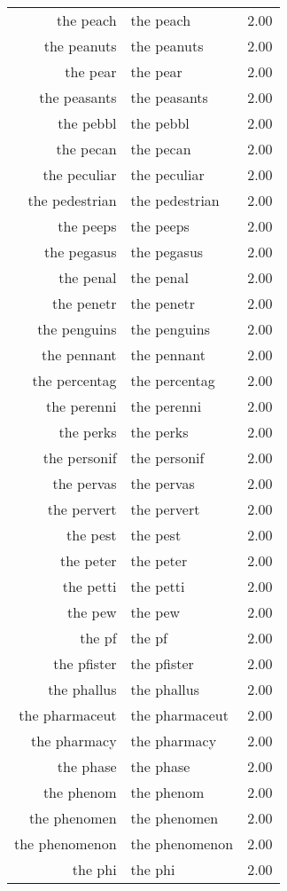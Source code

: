 \begin{table}[ht]
\begin{tabular}{rlr}
  the peach & the peach & 2.00 \\ 
  the peanuts & the peanuts & 2.00 \\ 
  the pear & the pear & 2.00 \\ 
  the peasants & the peasants & 2.00 \\ 
  the pebbl & the pebbl & 2.00 \\ 
  the pecan & the pecan & 2.00 \\ 
  the peculiar & the peculiar & 2.00 \\ 
  the pedestrian & the pedestrian & 2.00 \\ 
  the peeps & the peeps & 2.00 \\ 
  the pegasus & the pegasus & 2.00 \\ 
  the penal & the penal & 2.00 \\ 
  the penetr & the penetr & 2.00 \\ 
  the penguins & the penguins & 2.00 \\ 
  the pennant & the pennant & 2.00 \\ 
  the percentag & the percentag & 2.00 \\ 
  the perenni & the perenni & 2.00 \\ 
  the perks & the perks & 2.00 \\ 
  the personif & the personif & 2.00 \\ 
  the pervas & the pervas & 2.00 \\ 
  the pervert & the pervert & 2.00 \\ 
  the pest & the pest & 2.00 \\ 
  the peter & the peter & 2.00 \\ 
  the petti & the petti & 2.00 \\ 
  the pew & the pew & 2.00 \\ 
  the pf & the pf & 2.00 \\ 
  the pfister & the pfister & 2.00 \\ 
  the phallus & the phallus & 2.00 \\ 
  the pharmaceut & the pharmaceut & 2.00 \\ 
  the pharmacy & the pharmacy & 2.00 \\ 
  the phase & the phase & 2.00 \\ 
  the phenom & the phenom & 2.00 \\ 
  the phenomen & the phenomen & 2.00 \\ 
  the phenomenon & the phenomenon & 2.00 \\ 
  the phi & the phi & 2.00 \\ 

\end{tabular}
\end{table}
